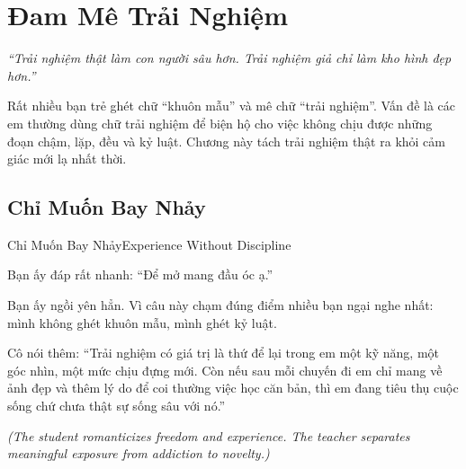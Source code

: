 \chapter{Đam Mê Trải Nghiệm}

\begin{center}
	\textit{\color{bookprimary}``Trải nghiệm thật làm con người sâu hơn. Trải nghiệm giả chỉ làm kho hình đẹp hơn.''}
\end{center}

\ngancach

\begin{tcolorbox}[
	colback=booksecondary!8,
	colframe=booksecondary!40,
	arc=5pt,
	title={\bfseries Chương Này Nói Về Gì?},
	fonttitle=\bfseries\color{booksecondary}
]
Rất nhiều bạn trẻ ghét chữ ``khuôn mẫu'' và mê chữ ``trải nghiệm''. Vấn đề là các em thường dùng chữ trải nghiệm để biện hộ cho việc không chịu được những đoạn chậm, lặp, đều và kỷ luật. Chương này tách trải nghiệm thật ra khỏi cảm giác mới lạ nhất thời.
\end{tcolorbox}

\section{Chỉ Muốn Bay Nhảy}
\begin{truyen}{Chỉ Muốn Bay Nhảy}{Experience Without Discipline}


Bạn ấy đáp rất nhanh: ``Để mở mang đầu óc ạ.''


Bạn ấy ngồi yên hẳn. Vì câu này chạm đúng điểm nhiều bạn ngại nghe nhất: mình không ghét khuôn mẫu, mình ghét kỷ luật.

Cô nói thêm: ``Trải nghiệm có giá trị là thứ để lại trong em một kỹ năng, một góc nhìn, một mức chịu đựng mới. Còn nếu sau mỗi chuyến đi em chỉ mang về ảnh đẹp và thêm lý do để coi thường việc học căn bản, thì em đang tiêu thụ cuộc sống chứ chưa thật sự sống sâu với nó.''

\textit{(The student romanticizes freedom and experience. The teacher separates meaningful exposure from addiction to novelty.)}
\end{truyen}

